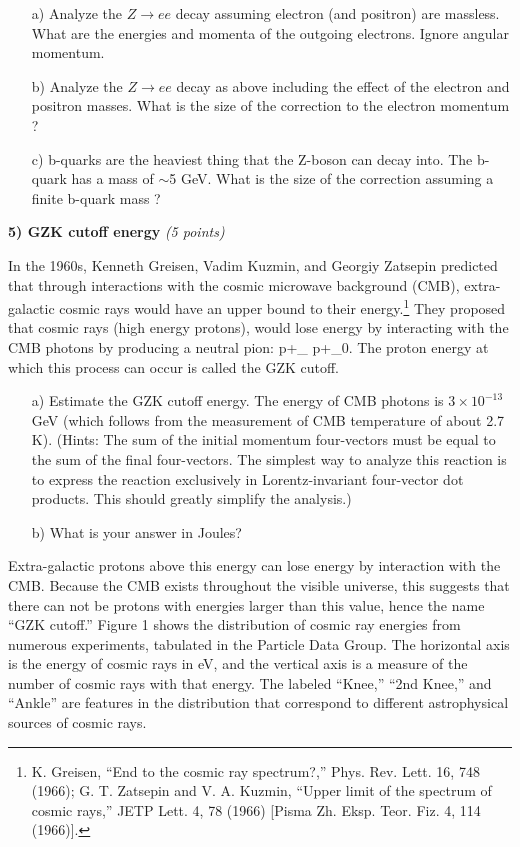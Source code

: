 \begin{itemize}
\item[a)]{ Analyze the $Z\rightarrow ee$ decay assuming electron (and positron) are massless.
What are the energies and momenta of the outgoing electrons. 
Ignore angular momentum.
}
\item[b)]{  Analyze the $Z\rightarrow ee$ decay as above including the effect of the electron and positron masses.
     What is the size of the correction to the electron momentum ? 
}
\item[c)]{ b-quarks are the heaviest thing that the Z-boson can decay into. The b-quark has a mass of $\sim$5 GeV. 
 What is the size of the correction assuming a finite b-quark mass ?
}
\end{itemize}

\vspace*{0.25in}

\textbf{5)  GZK cutoff energy} \hfill \textit{(5 points)}

In the 1960s, Kenneth Greisen, Vadim Kuzmin, and Georgiy Zatsepin predicted that through interactions with the cosmic microwave background (CMB), extra-galactic cosmic rays would have an upper bound to their energy.\footnote{K. Greisen, “End to the cosmic ray spectrum?,” Phys. Rev. Lett. 16, 748 (1966); G. T. Zatsepin and V. A. Kuzmin, “Upper limit of the spectrum of cosmic rays,” JETP Lett. 4, 78 (1966) [Pisma Zh. Eksp. Teor. Fiz. 4, 114 (1966)].}
They proposed that cosmic rays (high energy protons), would lose energy by interacting with the CMB photons by producing a neutral pion:
\be
p+\gamma_{} \rightarrow p+\pi_0.
\ee
The proton energy at which this process can occur is called the GZK cutoff. 

\begin{itemize}
\item[a)]{
Estimate the GZK cutoff energy.
The energy of CMB photons is $3 \times 10^{-13}$ GeV (which follows from the measurement of CMB temperature of about 2.7 K).
(Hints: The sum of the initial momentum four-vectors must be equal to the sum of the final four-vectors. 
The simplest way to analyze this reaction is to express the reaction exclusively in Lorentz-invariant four-vector dot products. 
This should greatly simplify the analysis.)
}
\item[b)]{What is your answer in Joules?}
\end{itemize}

Extra-galactic protons above this energy can lose energy by interaction with the CMB. 
Because the CMB exists throughout the visible universe, this suggests that there can not be protons with energies larger than this value, hence the name ``GZK cutoff.''
Figure 1 shows the distribution of cosmic ray energies from numerous experiments, tabulated in the Particle Data Group. 
The horizontal axis is the energy of cosmic rays in eV, and the vertical axis is a measure of the number of cosmic rays with that energy. 
The labeled ``Knee,'' ``2nd Knee,'' and ``Ankle'' are features in the distribution that correspond to different astrophysical sources of cosmic rays.

